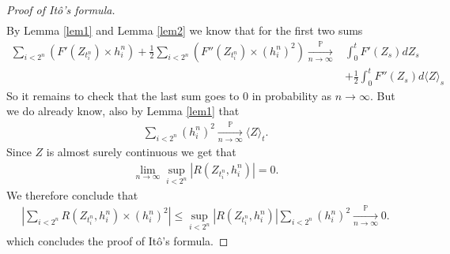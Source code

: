 \documentclass[../mainfile.tex]{subfiles}
\begin{document}
\begin{proof}[Proof of Itô's formula]
\begin{align*}
\end{align*}
By Lemma \ref{lem1} and Lemma \ref{lem2} we know that for the first two sums
\begin{align*}
\sum_{i<2^n} (F'(Z_{t_i^n}) \times h_i^n) + \frac{1}{2} \sum_{i < 2^n} (F''(Z_{t_i^n}) \times (h_i^n)^2) \xrightarrow[n \to \infty]{\mathbb{P}} &\int_0^t F'(Z_s)dZ_s  \\ &+ \frac{1}{2} \int_0^t F''(Z_s)d \langle Z \rangle_s
\end{align*}
\newpage
So it remains to check that the last sum goes to $0$ in probability as $n \to \infty$. But we do already know, also by Lemma \ref{lem1} that
\begin{align*}
\sum_{i < 2^n} (h_i^n)^2 \xrightarrow[n \to \infty]{ \mathbb{P}} \langle Z \rangle_t.
\end{align*}
Since $Z$ is almost surely continuous we get that
\begin{align*}
\lim_{n \to \infty} \sup_{i < 2^n} |R(Z_{t_i^n}, h_i^n)| =0.
\end{align*}
We therefore conclude that
\begin{align*}
\left| \sum_{i <2^n} R(Z_{t_i^n}, h_i^n) \times (h_i^n)^2 \right| \leq \sup_{i < 2^n} |R(Z_{t_i^n}, h_i^n)| \sum_{i <2^n} (h_i^n)^2 \xrightarrow[n \to \infty]{ \mathbb{P}} 0.
\end{align*}
which concludes the proof of Itô's formula. 
\end{proof}
\end{document}
